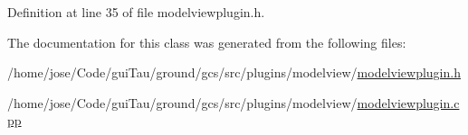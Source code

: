 Definition at line 35 of file modelviewplugin.\-h.



The documentation for this class was generated from the following files\-:\begin{DoxyCompactItemize}
\item 
/home/jose/\-Code/gui\-Tau/ground/gcs/src/plugins/modelview/\hyperlink{modelviewplugin_8h}{modelviewplugin.\-h}\item 
/home/jose/\-Code/gui\-Tau/ground/gcs/src/plugins/modelview/\hyperlink{modelviewplugin_8cpp}{modelviewplugin.\-cpp}\end{DoxyCompactItemize}

